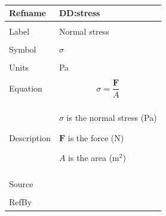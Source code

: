 \documentclass[12pt]{article}
\begin{document}
~\newline
 \noindent \begin{minipage}{\textwidth}
\begin{tabular}{p{} p{}}
\toprule \textbf{Refname} & \textbf{DD:stress}
\label{DD:stress}
\\ \midrule \\
Label & Normal stress
        \\ \midrule \\
        Symbol & $σ$
                 \\ \midrule \\
                 Units & Pa
                         \\ \midrule \\
                         Equation & \begin{dmath}
                                    σ=\frac{\mathbf{F}}{A}
                                    \end{dmath}
                                    \\ \midrule \\
                                    Description & \begin{symbDescription}
                                                  \item{$σ$ is the normal stress (Pa)}
                                                  \item{$\mathbf{F}$ is the force (N)}
                                                  \item{$A$ is the area ($\text{m}^{2}$)}
                                                  \end{symbDescription}
                                                  \\ \midrule \\
                                                  Source & \cite{huston2008}
                                                           \\ \midrule \\
                                                           RefBy & 
\\ \bottomrule \end{tabular}
\end{minipage}\\
~\newline
\end{document}

